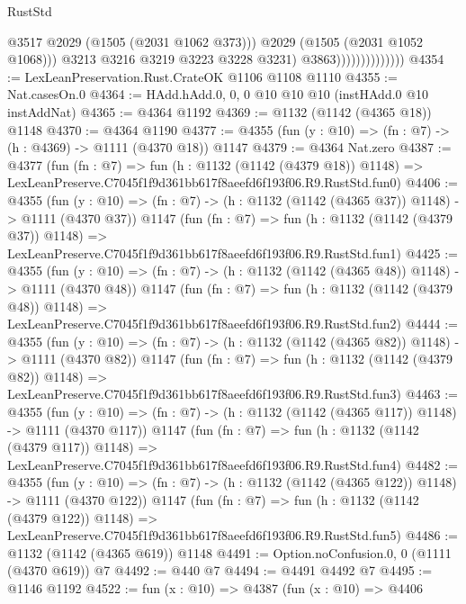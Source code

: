 \begin{lexlean}{RustStd}
\begin{coremodule}
                                      @3517
                                      @2029
                                      (@1505 (@2031 @1062 @373)))
                                    @2029
                                    (@1505 (@2031 @1052 @1068)))
                                  @3213
                                  @3216
                                  @3219
                                  @3223
                                  @3228
                                  @3231)
                                @3863))))))))))))))
@4354 := LexLeanPreservation.Rust.CrateOK @1106 @1108 @1110
@4355 := Nat.casesOn.{0}
@4364 := HAdd.hAdd.{0, 0, 0} @10 @10 @10 (instHAdd.{0} @10 instAddNat)
@4365 := @4364 @1192
@4369 := @1132 (@1142 (@4365 @18)) @1148
@4370 := @4364 @1190
@4377 := @4355 (fun (y : @10) => (fn : @7) -> (h : @4369) -> @1111 (@4370 @18)) @1147
@4379 := @4364 Nat.zero
@4387 := @4377
    (fun (fn : @7) =>
    fun (h : @1132 (@1142 (@4379 @18)) @1148) =>
    LexLeanPreserve.C7045f1f9d361bb617f8aeefd6f193f06.R9.RustStd.fun0)
@4406 := @4355
    (fun (y : @10) => (fn : @7) -> (h : @1132 (@1142 (@4365 @37)) @1148) -> @1111 (@4370 @37))
    @1147
    (fun (fn : @7) =>
    fun (h : @1132 (@1142 (@4379 @37)) @1148) =>
    LexLeanPreserve.C7045f1f9d361bb617f8aeefd6f193f06.R9.RustStd.fun1)
@4425 := @4355
    (fun (y : @10) => (fn : @7) -> (h : @1132 (@1142 (@4365 @48)) @1148) -> @1111 (@4370 @48))
    @1147
    (fun (fn : @7) =>
    fun (h : @1132 (@1142 (@4379 @48)) @1148) =>
    LexLeanPreserve.C7045f1f9d361bb617f8aeefd6f193f06.R9.RustStd.fun2)
@4444 := @4355
    (fun (y : @10) => (fn : @7) -> (h : @1132 (@1142 (@4365 @82)) @1148) -> @1111 (@4370 @82))
    @1147
    (fun (fn : @7) =>
    fun (h : @1132 (@1142 (@4379 @82)) @1148) =>
    LexLeanPreserve.C7045f1f9d361bb617f8aeefd6f193f06.R9.RustStd.fun3)
@4463 := @4355
    (fun (y : @10) => (fn : @7) -> (h : @1132 (@1142 (@4365 @117)) @1148) -> @1111 (@4370 @117))
    @1147
    (fun (fn : @7) =>
    fun (h : @1132 (@1142 (@4379 @117)) @1148) =>
    LexLeanPreserve.C7045f1f9d361bb617f8aeefd6f193f06.R9.RustStd.fun4)
@4482 := @4355
    (fun (y : @10) => (fn : @7) -> (h : @1132 (@1142 (@4365 @122)) @1148) -> @1111 (@4370 @122))
    @1147
    (fun (fn : @7) =>
    fun (h : @1132 (@1142 (@4379 @122)) @1148) =>
    LexLeanPreserve.C7045f1f9d361bb617f8aeefd6f193f06.R9.RustStd.fun5)
@4486 := @1132 (@1142 (@4365 @619)) @1148
@4491 := Option.noConfusion.{0, 0} (@1111 (@4370 @619)) @7
@4492 := @440 @7
@4494 := @4491 @4492 @7
@4495 := @1146 @1192
@4522 := fun (x : @10) =>
  @4387
    (fun (x : @10) =>
    @4406

\end{coremodule}
\end{lexlean}
